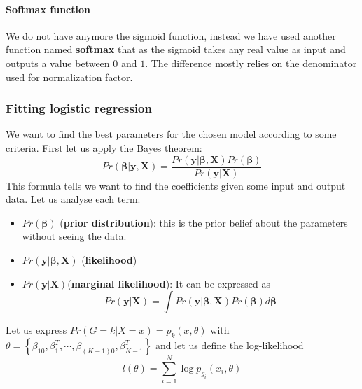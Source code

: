 \documentclass[12pt, letterpaper]{article}
\theoremstyle{definition}
\newcommand{\X}{\mathrm{\mathbf{X}}}
\newcommand{\y}{\mathbf{y}}
\newcommand{\be}{\mathbf{\beta}}
\begin{document}
\paragraph{\textbf{Softmax function}} We do not have anymore the sigmoid function, instead we have used another function named \textbf{softmax} that as the sigmoid takes any real value as input and outputs a value between $0$ and $1$. The difference mostly relies on the denominator used for normalization factor.

\subsubsection{Fitting logistic regression}
We want to find the best parameters for the chosen model according to some criteria. First let us apply the Bayes theorem:
\begin{equation}
Pr\left(\be|\y,\X\right) = \frac{Pr\left(\y|\be,\X\right) Pr(\be)}{Pr(\y|\X)}
\end{equation}
This formula tells we want to find the coefficients given some input and output data. Let us analyse each term:
\begin{itemize}
\item $Pr(\be)$ (\textbf{prior distribution}): this is the prior belief about the parameters without seeing the data.
\item $Pr\left(\y|\be,\X\right)$ (\textbf{likelihood})
\item $Pr(\y|\X)$(\textbf{marginal likelihood}): It can be expressed as 
\begin{equation}
Pr(\y|\X) = \int Pr\left(\y|\be,\X\right) Pr(\be) d\be
\end{equation}
\end{itemize}

Let us express $Pr\left(G=k|X=x\right)=p_k(x,\theta)$ with $\theta = \left\lbrace \beta_{10},\beta_1^T,\cdots, \beta_{\left(K-1\right)0},\beta_{K-1}^T\right\rbrace$
and let us define the log-likelihood
\begin{equation}
l(\theta) = \sum_{i=1}^N \log p_{g_i}\left(x_i, \theta\right)
\end{equation}
\end{document}
